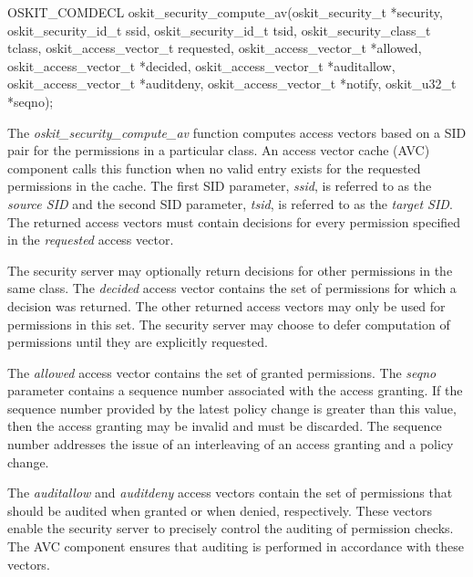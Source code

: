 \begin{apisyn}

	\funcproto OSKIT_COMDECL
	oskit_security_compute_av(oskit_security_t *security, 
		          oskit_security_id_t ssid,
			  oskit_security_id_t tsid,
                          oskit_security_class_t tclass,
			  oskit_access_vector_t requested,
		\outparam oskit_access_vector_t *allowed,
		\outparam oskit_access_vector_t *decided,
		\outparam oskit_access_vector_t *auditallow,
		\outparam oskit_access_vector_t *auditdeny,
		\outparam oskit_access_vector_t *notify,
		\outparam oskit_u32_t *seqno);
\end{apisyn}
\begin{apidesc}

The \emph{oskit\_security\_compute\_av} function computes access vectors
based on a SID pair for the permissions in a particular class.  An 
access vector cache (AVC) component calls this function when no valid
entry exists for the requested permissions in the cache.  The
first SID parameter, \emph{ssid}, is referred to as the \emph{source
SID} and the second SID parameter, \emph{tsid}, is referred to as the
\emph{target SID}.  The returned access vectors must contain decisions
for every permission specified in the \emph{requested} access vector.

The security server may optionally return decisions for other
permissions in the same class.  The \emph{decided} access vector  
contains the set of permissions for which a decision was returned. 
The other returned access vectors may only be used for permissions in
this set.  The security server may choose to defer computation
of permissions until they are explicitly requested.

The \emph{allowed} access vector contains the set of granted
permissions.  The \emph{seqno} parameter contains a sequence number
associated with the access granting.  If the sequence number provided
by the latest policy change is greater than this value, then the
access granting may be invalid and must be discarded.  The sequence
number addresses the issue of an interleaving of an access granting
and a policy change.

The \emph{auditallow} and \emph{auditdeny} access vectors 
contain the set of permissions that  
should be audited when granted or when denied, respectively.  These 
vectors enable the security server to precisely control the auditing  
of permission checks.  The AVC component ensures that
auditing is performed in accordance with these vectors.


\end{apidesc}
